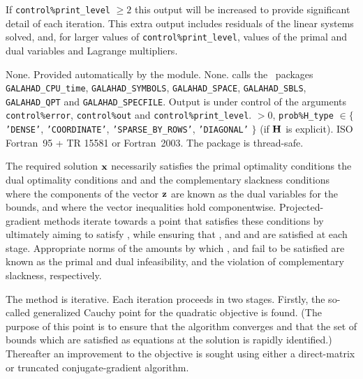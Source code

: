 \documentclass{galahad}
\newcommand{\packagename}{BQP}
\begin{document}
If {\tt control\%print\_level} $\geq 2$ this 
output will be increased to provide significant detail of each iteration. 
This extra output includes residuals of the linear systems solved, and,
for larger values of {\tt control\%print\_level}, values of the primal and dual
variables and Lagrange multipliers. 


\galgeneral

\galcommon None.
\galworkspace Provided automatically by the module.
\galroutines None. 
\galmodules {\tt \packagename\_solve} calls the \galahad\ packages
{\tt GALAHAD\_CPU\_time},
{\tt GALAHAD\_SY\-M\-BOLS}, \newline
{\tt GALAHAD\_SPACE}, 
{\tt GALAHAD\_SBLS},
{\tt GALAHAD\_QPT} and
{\tt GALAHAD\_SPECFILE}.
\galio Output is under control of the arguments
 {\tt control\%error}, {\tt control\%out} and {\tt control\%print\_level}.
 $> 0$, 
{\tt prob\%H\_type} $\in \{${\tt 'DENSE'}, 
 {\tt 'COORDINATE'}, {\tt 'SPARSE\_BY\_\-ROWS'}, {\tt 'DIAGONAL'} $\}$
(if ${\mathbf{H}}$ is explicit).
\galportability ISO Fortran~95 + TR 15581 or Fortran~2003. 
The package is thread-safe.


\galmethod
The required solution ${\mathbf{x}}$ necessarily satisfies 
the primal optimality conditions
the dual optimality conditions
and 
and the complementary slackness conditions 
where the components of the vector ${\mathbf{z}}$ are known as 
the dual variables for the bounds,
and where the vector inequalities hold componentwise.
Projected-gradient methods iterate towards a point
that satisfies these conditions by ultimately aiming to satisfy
, while ensuring that 
, and  and  are satisfied at each stage. 
Appropriate norms of the amounts by 
which ,  and  fail to be satisfied are known as the
primal and dual infeasibility, and the violation of complementary slackness,
respectively. 

The method is iterative. Each iteration proceeds in two stages.
Firstly, the so-called generalized Cauchy point for the quadratic
objective is found.  (The purpose of this point is to ensure that the
algorithm converges and that the set of bounds which are satisfied as
equations at the solution is rapidly identified.)  Thereafter an
improvement to the objective is sought using either a
direct-matrix or truncated conjugate-gradient algorithm.
\end{document}
